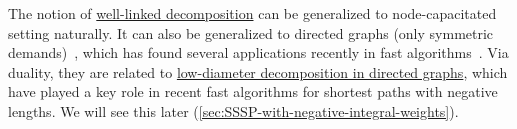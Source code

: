 The notion of \hyperref[thm:well-linked-decomposition]{well-linked decomposition} can be generalized to node-capacitated setting naturally. It can also be generalized to directed graphs (only symmetric demands)~\cite{chekuri2015all}, which has found several applications recently in fast algorithms~\cite{bernstein2020deterministic}. Via duality, they are related to \hyperref[thm:directed-LDD]{low-diameter decomposition in directed graphs}, which have played a key role in recent fast algorithms for shortest paths with negative lengths. We will see this later (\autoref{sec:SSSP-with-negative-integral-weights}).